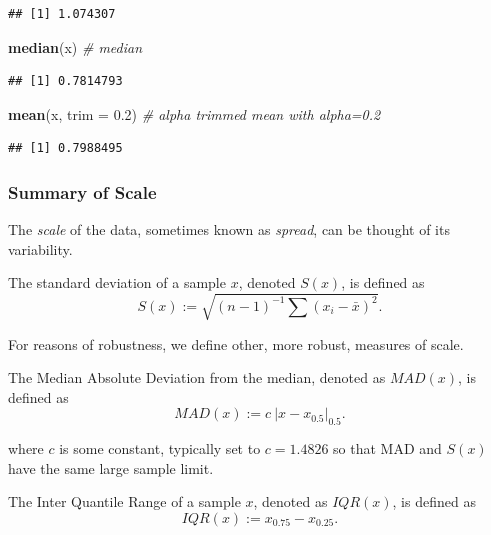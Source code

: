 \documentclass[]{book}
\newenvironment{Shaded}{\begin{snugshade}}{\end{snugshade}}
\newcommand{\KeywordTok}[1]{\textcolor[rgb]{0.13,0.29,0.53}{\textbf{#1}}}
\newcommand{\DataTypeTok}[1]{\textcolor[rgb]{0.13,0.29,0.53}{#1}}
\newcommand{\FloatTok}[1]{\textcolor[rgb]{0.00,0.00,0.81}{#1}}
\newcommand{\CommentTok}[1]{\textcolor[rgb]{0.56,0.35,0.01}{\textit{#1}}}
\newcommand{\NormalTok}[1]{#1}
\theoremstyle{definition}
\theoremstyle{definition}
\theoremstyle{definition}
\theoremstyle{remark}
\let\BeginKnitrBlock\begin \let\EndKnitrBlock\end
\begin{document}
\begin{verbatim}
## [1] 1.074307
\end{verbatim}

\begin{Shaded}
\begin{Highlighting}[]
\KeywordTok{median}\NormalTok{(x) }\CommentTok{# median}
\end{Highlighting}
\end{Shaded}

\begin{verbatim}
## [1] 0.7814793
\end{verbatim}

\begin{Shaded}
\begin{Highlighting}[]
\KeywordTok{mean}\NormalTok{(x, }\DataTypeTok{trim =} \FloatTok{0.2}\NormalTok{) }\CommentTok{# alpha trimmed mean with alpha=0.2}
\end{Highlighting}
\end{Shaded}

\begin{verbatim}
## [1] 0.7988495
\end{verbatim}

\subsubsection{Summary of Scale}\label{summary-of-scale}

The \emph{scale} of the data, sometimes known as \emph{spread}, can be
thought of its variability.

\BeginKnitrBlock{definition}[Standard Deviation]
\protect\hypertarget{def:unnamed-chunk-103}{}{\label{def:unnamed-chunk-103}
{} }The standard deviation of a sample
\(x\), denoted \(S(x)\), is defined as
\[ S(x):=\sqrt{(n-1)^{-1} \sum (x_i-\bar x)^2} . \]
\EndKnitrBlock{definition}

For reasons of robustness, we define other, more robust, measures of
scale.

\BeginKnitrBlock{definition}[MAD]
\protect\hypertarget{def:unnamed-chunk-104}{}{\label{def:unnamed-chunk-104}
{} }The Median Absolute Deviation from the median,
denoted as \(MAD(x)\), is defined as
\[MAD(x):= c \: |x-x_{0.5}|_{0.5} . \]
\EndKnitrBlock{definition}

where \(c\) is some constant, typically set to \(c=1.4826\) so that MAD
and \(S(x)\) have the same large sample limit.

\BeginKnitrBlock{definition}[IQR]
\protect\hypertarget{def:unnamed-chunk-105}{}{\label{def:unnamed-chunk-105}
{} }The Inter Quantile Range of a sample \(x\),
denoted as \(IQR(x)\), is defined as \[ IQR(x):= x_{0.75}-x_{0.25} .\]
\EndKnitrBlock{definition}
\end{document}
